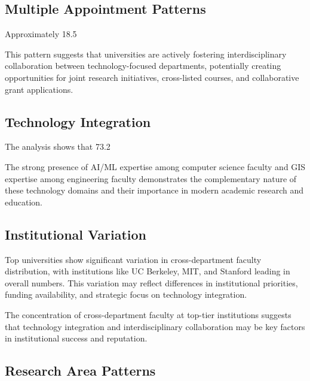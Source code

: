 \documentclass[12pt]{article}
\begin{document}
\subsection{Multiple Appointment Patterns}

Approximately 18.5%

This pattern suggests that universities are actively fostering interdisciplinary collaboration between technology-focused departments, potentially creating opportunities for joint research initiatives, cross-listed courses, and collaborative grant applications.

\subsection{Technology Integration}

The analysis shows that 73.2%

The strong presence of AI/ML expertise among computer science faculty and GIS expertise among engineering faculty demonstrates the complementary nature of these technology domains and their importance in modern academic research and education.

\subsection{Institutional Variation}

Top universities show significant variation in cross-department faculty distribution, with institutions like UC Berkeley, MIT, and Stanford leading in overall numbers. This variation may reflect differences in institutional priorities, funding availability, and strategic focus on technology integration.

The concentration of cross-department faculty at top-tier institutions suggests that technology integration and interdisciplinary collaboration may be key factors in institutional success and reputation.

\subsection{Research Area Patterns}
\end{document}
